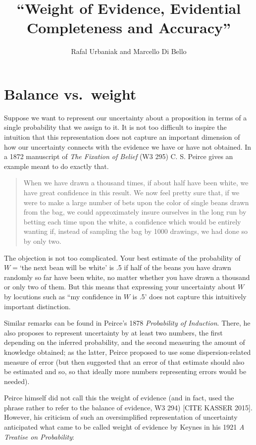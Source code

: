 \documentclass[
  10pt,
  dvipsnames,enabledeprecatedfontcommands]{scrartcl}
\title{``Weight of Evidence, Evidential Completeness and Accuracy''}
\author{Rafal Urbaniak and Marcello Di Bello}
\date{}
\begin{document}
\maketitle

\hypertarget{balance-vs.-weight}{%
\section{Balance vs.~weight}\label{balance-vs.-weight}}

Suppose we want to represent our uncertainty about a proposition in
terms of a single probability that we assign to it. It is not too
difficult to inspire the intuition that this representation does not
capture an important dimension of how our uncertainty connects with the
evidence we have or have not obtained. In a 1872 manuscript of
\emph{The Fixation of Belief} (W3 295) C. S. Peirce gives an example
meant to do exactly that.

\begin{quote} When we have drawn a thousand times, if about half have been white, we have great confidence in this result. We now feel pretty sure that, if we were to make a large number of bets upon the color of single beans drawn from the bag, we could approximately insure ourselves in the long run by betting each time upon the white, a confidence which would be entirely wanting if, instead of sampling the bag by 1000 drawings, we had done so by only two.
\end{quote}

\noindent The objection is not too complicated. Your best estimate of
the probability of \(W=\)`the next bean will be white' is .5 if half of
the beans you have drawn randomly so far have been white, no matter
whether you have drawn a thousand or only two of them. But this means
that expressing your uncertainty about \(W\) by locutions such as ``my
confidence in \(W\) is .5' does not capture this intuitively important
distinction.

Similar remarks can be found in Peirce's 1878
\emph{Probability of Induction}. There, he also proposes to represent
uncertainty by at least two numbers, the first depending on the inferred
probability, and the second measuring the amount of knowledge obtained;
as the latter, Peirce proposed to use some dispersion-related measure of
error (but then suggested that an error of that estimate should also be
estimated and so, so that ideally more numbers representing errors would
be needed).

Peirce himself did not call this the weight of evidence (and in fact,
used the phrase rather to refer to the balance of evidence, W3 294)
{[}CITE KASSER 2015{]}. However, his criticism of such an oversimplified
representation of uncertainty anticipated what came to be called weight
of evidence by Keynes in his 1921 \emph{A Treatise on Probability}:
\end{document}
